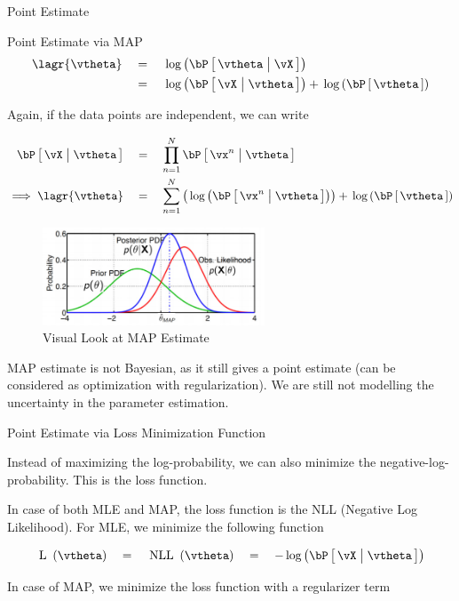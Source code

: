 \documentclass{article}
\begin{document}
\begin{ssection}{Point Estimate}
\begin{ssubsection}{Point Estimate via MAP}
		\begin{align*}
			\lagr{\vtheta}	&\eq	\log{\prob{\vtheta \pipe \vX}} \\
									&\eq	\log{\prob{\vX \pipe \vtheta}} + \log{\prob{\vtheta}}
		\end{align*}

		Again, if the data points are independent, we can write

		\begin{align*}
			\prob{\vX \pipe \vtheta}		&\eq	\prod_{n = 1}^N \prob{\vx^n \pipe \vtheta} \\
			\implies \lagr{\vtheta}	&\eq	\sum_{n = 1}^N \para{\log{\prob{\vx^n \pipe \vtheta}}} + \log{\prob{\vtheta}}
		\end{align*}

		\begin{figure}[h!]
			\centering
			\includegraphics[width=250px]{includes/scribe02/map-estimate.png}
			\caption{Visual Look at MAP Estimate}
		\end{figure}


		MAP estimate is not Bayesian, as it still gives a point estimate (can be considered as optimization with regularization). We are still not modelling the uncertainty in the parameter estimation.

	\end{ssubsection}

	\begin{ssubsection}{Point Estimate via Loss Minimization Function}

		Instead of maximizing the log-probability, we can also minimize the negative-log-probability. This is the loss function. \br

		In case of both MLE and MAP, the loss function is the NLL (Negative Log Likelihood). For MLE, we minimize the following function

		\begin{align*}
			\func{\mt{L}}{\vtheta}	\eq	\func{\mt{NLL}}{\vtheta}	\eq	-\log{\prob{\vX \pipe \vtheta}}
		\end{align*}

		In case of MAP, we minimize the loss function with a regularizer term


\end{ssubsection}
\end{ssection}
\end{document}
